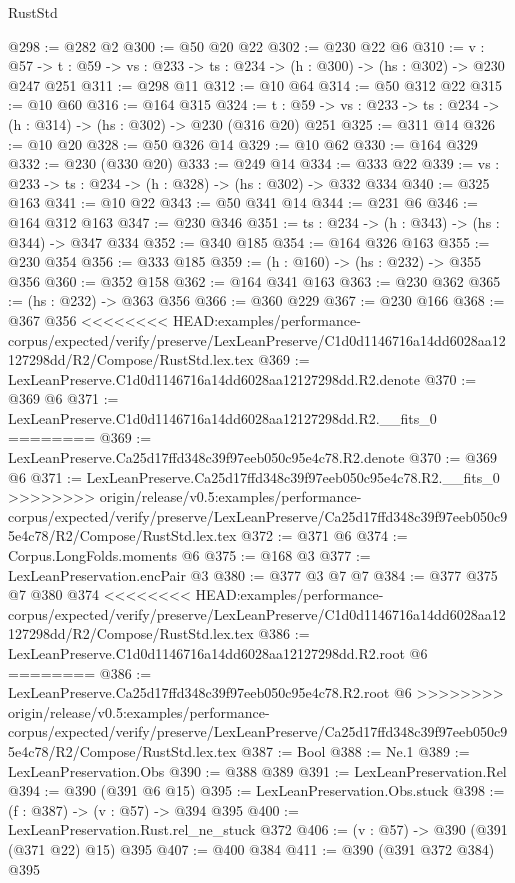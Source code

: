 \begin{lexlean}{RustStd}
\begin{coremodule}
{\begin{coremodule}
@298 := @282 @2
@300 := @50 @20 @22
@302 := @230 @22 @6
@310 := {v : @57} ->
  {t : @59} -> {vs : @233} -> {ts : @234} -> (h : @300) -> (hs : @302) -> @230 @247 @251
@311 := @298 @11
@312 := @10 @64
@314 := @50 @312 @22
@315 := @10 @60
@316 := @164 @315
@324 := {t : @59} -> {vs : @233} -> {ts : @234} -> (h : @314) -> (hs : @302) -> @230 (@316 @20) @251
@325 := @311 @14
@326 := @10 @20
@328 := @50 @326 @14
@329 := @10 @62
@330 := @164 @329
@332 := @230 (@330 @20)
@333 := @249 @14
@334 := @333 @22
@339 := {vs : @233} -> {ts : @234} -> (h : @328) -> (hs : @302) -> @332 @334
@340 := @325 @163
@341 := @10 @22
@343 := @50 @341 @14
@344 := @231 @6
@346 := @164 @312 @163
@347 := @230 @346
@351 := {ts : @234} -> (h : @343) -> (hs : @344) -> @347 @334
@352 := @340 @185
@354 := @164 @326 @163
@355 := @230 @354
@356 := @333 @185
@359 := (h : @160) -> (hs : @232) -> @355 @356
@360 := @352 @158
@362 := @164 @341 @163
@363 := @230 @362
@365 := (hs : @232) -> @363 @356
@366 := @360 @229
@367 := @230 @166
@368 := @367 @356
<<<<<<<< HEAD:examples/performance-corpus/expected/verify/preserve/LexLeanPreserve/C1d0d1146716a14dd6028aa12127298dd/R2/Compose/RustStd.lex.tex
@369 := LexLeanPreserve.C1d0d1146716a14dd6028aa12127298dd.R2.denote
@370 := @369 @6
@371 := LexLeanPreserve.C1d0d1146716a14dd6028aa12127298dd.R2.__fits_0
========
@369 := LexLeanPreserve.Ca25d17ffd348c39f97eeb050c95e4c78.R2.denote
@370 := @369 @6
@371 := LexLeanPreserve.Ca25d17ffd348c39f97eeb050c95e4c78.R2.__fits_0
>>>>>>>> origin/release/v0.5:examples/performance-corpus/expected/verify/preserve/LexLeanPreserve/Ca25d17ffd348c39f97eeb050c95e4c78/R2/Compose/RustStd.lex.tex
@372 := @371 @6
@374 := Corpus.LongFolds.moments @6
@375 := @168 @3
@377 := LexLeanPreservation.encPair @3
@380 := @377 @3 @7 @7
@384 := @377 @375 @7 @380 @374
<<<<<<<< HEAD:examples/performance-corpus/expected/verify/preserve/LexLeanPreserve/C1d0d1146716a14dd6028aa12127298dd/R2/Compose/RustStd.lex.tex
@386 := LexLeanPreserve.C1d0d1146716a14dd6028aa12127298dd.R2.root @6
========
@386 := LexLeanPreserve.Ca25d17ffd348c39f97eeb050c95e4c78.R2.root @6
>>>>>>>> origin/release/v0.5:examples/performance-corpus/expected/verify/preserve/LexLeanPreserve/Ca25d17ffd348c39f97eeb050c95e4c78/R2/Compose/RustStd.lex.tex
@387 := Bool
@388 := Ne.{1}
@389 := LexLeanPreservation.Obs
@390 := @388 @389
@391 := LexLeanPreservation.Rel
@394 := @390 (@391 @6 @15)
@395 := LexLeanPreservation.Obs.stuck
@398 := (f : @387) -> (v : @57) -> @394 @395
@400 := LexLeanPreservation.Rust.rel_ne_stuck @372
@406 := (v : @57) -> @390 (@391 (@371 @22) @15) @395
@407 := @400 @384
@411 := @390 (@391 @372 @384) @395

\end{coremodule}}
\end{coremodule}
\end{lexlean}

